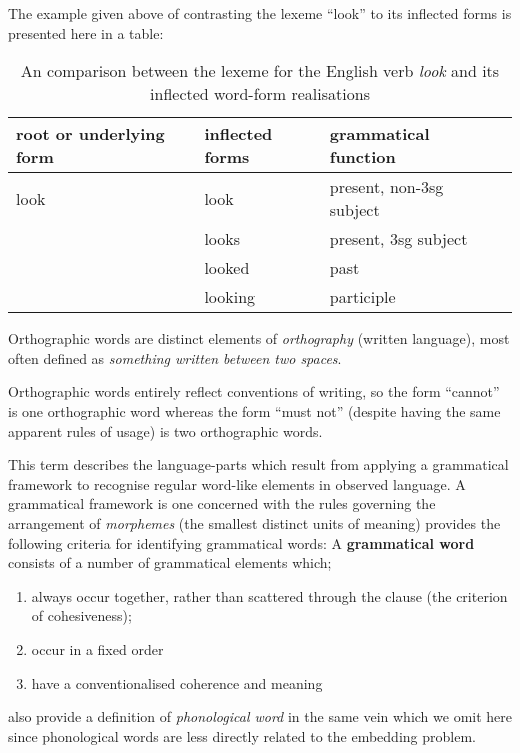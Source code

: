 \begin{example}\label{ex:lexemes}
  The example given above of contrasting the lexeme ``look'' to its inflected forms is presented here in a table:
  \begin{table}[H]
    \centering
    \begin{tabular}{l l l l}
      \toprule
      root or underlying form & inflected forms & grammatical function\\
      \midrule
      look                    & look            & present, non-3sg subject\\
                              & looks           & present, 3sg subject\\
                              & looked          & past\\
                              & looking         & participle\\
      \bottomrule
    \end{tabular}
    \caption{An comparison between the lexeme for the English verb \emph{look} and its inflected word-form realisations}
  \end{table}
\end{example}
\vspace{1em}
\begin{definition}
  Orthographic words are distinct elements of \emph{orthography} (written language), most often defined as \emph{something written between two spaces}.
\end{definition}
\begin{example}\label{ex:orthographic-words}
  Orthographic words entirely reflect conventions of writing, so the form ``cannot'' is one orthographic word whereas the form ``must not'' (despite having the same apparent rules of usage) is two orthographic words.
\end{example}
\begin{definition}
  This term describes the language-parts which result from applying a grammatical framework to recognise regular word-like elements in observed language. A grammatical framework is one concerned with the rules governing the arrangement of \emph{morphemes} (the smallest distinct units of meaning)
  \textcite{dixon02-word} provides the following criteria for identifying grammatical words:
  A \textbf{grammatical word} consists of a number of grammatical elements which;
  \begin{enumerate}[label=(\alph*)]
  \item always occur together, rather than scattered through the clause (the criterion of cohesiveness);
  \item occur in a fixed order
  \item have a conventionalised coherence and meaning
  \end{enumerate}
  \citeauthor{dixon02-word} also provide a definition of \emph{phonological word} in the same vein which we omit here since phonological words are less directly related to the embedding problem\footnotemark.
\end{definition}
